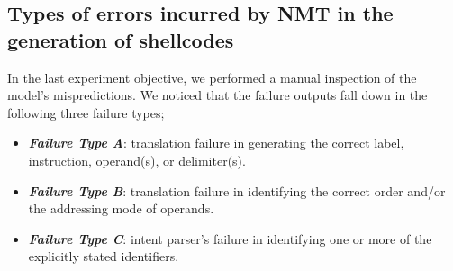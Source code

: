 \begin{comment}
\begin{figure}[ht]
\centering
\texttt{[image: img/kde.pdf]}
    \caption{Density-plots visualizing the statistics, in terms of lines of assembly code, of the  30 shellcodes in the test set. The labels \textit{Fully Correct} and \textit{Incorrect} refer to the shellcodes that are generated by the approach as fully correct ($n_{sem}/n_t = 1$) and incorrect ($n_{sem}/n_t < 1$), respectively.}
    \label{fig:shellcode_length}
\end{figure}



\begin{table*}[ht]
\centering
\caption{Descriptive statistics, in terms of lines of assembly code, of the  30 shellcodes in the test set. \textit{Fully Correct} and \textit{Incorrect} refer to the shellcodes that are generated by the approach as fully correct ($n_{sem}/n_t = 1$) and incorrect ($n_{sem}/n_t < 1$), respectively. Distribution shows a density plot.}
\label{tab:shellcode_quartiles}
\begin{tabular}{
>{\centering\arraybackslash}m{1.5cm}| 
>{\centering\arraybackslash}m{1cm}
>{\centering\arraybackslash}m{1cm}
>{\centering\arraybackslash}m{1cm}
>{\centering\arraybackslash}m{1cm} |
>{\centering\arraybackslash}m{3cm}}
\toprule
 & \textbf{$1^{st}$ Qu.} & \textbf{$2^{nd}$ Qu.} & \textbf{$3^{rd}$ Qu.} & \textbf{$4^{th}$ Qu.} & \textbf{Distribution}\\
\midrule
& & & & & \multirow{3}{*}[0cm]{\texttt{[image: img/kde2.pdf]}}\\[0.4cm]
\textit{Fully correct} & 15.00  & 20.00 & 26.75 &  40.00 &
\\[0.4cm]
\textit{Incorrect} & 20.75  & 28.50 & 39.00 & 61.00 & 
\\[0.4cm]
\bottomrule
\end{tabular}
\end{table*}
\end{comment}




\subsection{Types of errors incurred by NMT in the generation of shellcodes}
\label{subsec:RQ4}

In the last experiment objective, we performed a manual inspection of the model's mispredictions. We noticed that the failure outputs fall down in the following three failure types;
\begin{itemize}
    \item \textbf{\textit{Failure Type A}}: translation failure in generating the correct label, instruction, operand(s), or delimiter(s).
    \item \textbf{\textit{Failure Type B}}:  translation failure in identifying the correct order and/or the addressing mode of operands.
    \item \textbf{\textit{Failure Type C}}: intent parser's failure in identifying one or more of the explicitly stated identifiers.
\end{itemize}


